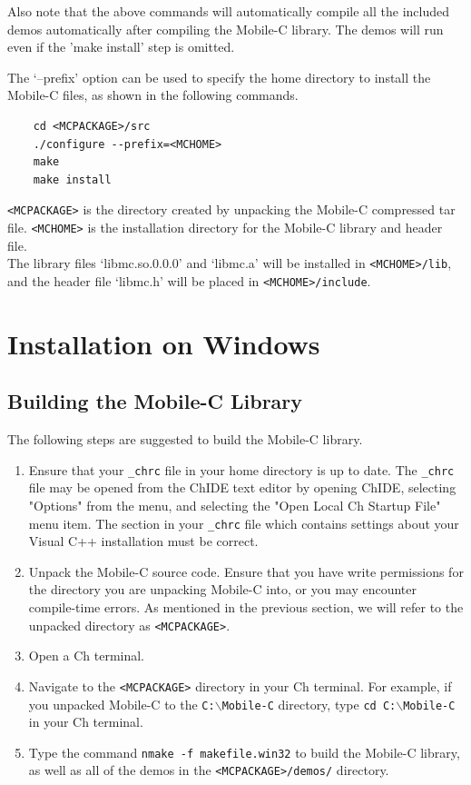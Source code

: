 \documentclass[11pt]{report}
\begin{document}
Also note that the above commands will automatically compile all the included
demos automatically after compiling the Mobile-C library. The demos will
run even if the 'make install' step is omitted.

The `--prefix' option can be used to specify the home directory to 
install the Mobile-C files, as shown in the following commands.

\begin{verbatim}
    cd <MCPACKAGE>/src
    ./configure --prefix=<MCHOME>
    make
    make install
\end{verbatim}

\noindent
\texttt{<MCPACKAGE>} is the directory created by unpacking the Mobile-C compressed 
tar file.
\texttt{<MCHOME>} is the installation directory for the Mobile-C library and 
header file.\\
\noindent
The library files `libmc.so.0.0.0' and `libmc.a' will be installed in 
\texttt{<MCHOME>/lib}, and the header file `libmc.h' will be placed in 
\texttt{<MCHOME>/include}.


\section{Installation on Windows}
\subsection{Building the Mobile-C Library}
The following steps are suggested to build the Mobile-C library.
\begin{enumerate}
\item Ensure that your \texttt{\_chrc} file in your home directory is up to
  date. The \texttt{\_chrc} file may be opened from the ChIDE text editor by
  opening ChIDE, selecting "Options" from the menu, and selecting the "Open
  Local Ch Startup File" menu item. The section in your \texttt{\_chrc} file
  which contains settings about
  your Visual C++ installation must be correct. 
\item Unpack the Mobile-C source code. Ensure that you have write permissions
  for the directory you are unpacking Mobile-C into, or you may encounter 
  compile-time errors. As mentioned in the previous section, we will refer
  to the unpacked directory as \texttt{<MCPACKAGE>}.
\item Open a Ch terminal.
\item Navigate to the \texttt{<MCPACKAGE>} directory in your Ch terminal. For
  example, if you unpacked Mobile-C to the \texttt{C:$\backslash$Mobile-C} directory, type
  \texttt{cd C:$\backslash$Mobile-C} in your Ch terminal.
\item Type the command \texttt{nmake -f makefile.win32} to build the Mobile-C
  library, as well as all of the demos in the \texttt{<MCPACKAGE>/demos/}
  directory.
\end{enumerate}
\end{document}
